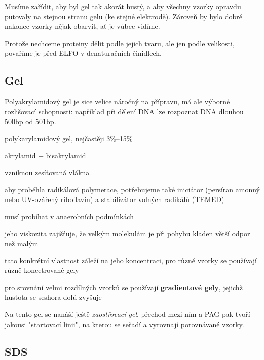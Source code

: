 \documentclass[DIV=8]{scrreprt}
\begin{document}
Musíme zařídit, aby byl gel tak akorát hustý, a aby všechny vzorky opravdu putovaly na stejnou stranu gelu (ke stejné elektrodě). Zároveň by bylo dobré nakonec vzorky nějak obarvit, ať je vůbec vidíme.

Protože nechceme proteiny dělit podle jejich tvaru, ale jen podle velikosti, povaříme je před ELFO v denaturačních činidlech.

\subsection{Gel} \label{Gel}


Polyakrylamidový gel je sice velice náročný na přípravu, má ale výborné rozlišovací schopnosti: například při dělení DNA lze rozpoznat DNA dlouhou 500bp od 501bp.

\begin{myItemize}[nosep]
    \item polykarylamidový gel, nejčastěji 3\%--15\%
    \item akrylamid \(+\) bisakrylamid
\begin{myItemize}[nosep]
    \item vzniknou zesíťovaná vlákna
    \item aby proběhla radikálová polymerace, potřebujeme také iniciátor (persíran amonný nebo UV-ozářený riboflavin) a stabilizátor volných radikálů (TEMED)
    \item musí probíhat v anaerobních podmínkách
\end{myItemize}

    \item jeho viskozita zajišťuje, že velkým molekulám je při pohybu kladen větší odpor než malým
\begin{myItemize}[nosep]
    \item tato konkrétní vlastnost záleží na jeho koncentraci, pro různé vzorky se používají různě koncetrované gely
    \item pro srovnání velmi rozdílných vzorků se používají \textbf{gradientové gely}, jejichž hustota se seshora dolů zvyšuje
\end{myItemize}

\end{myItemize}



Na tento gel se nanáší ještě \emph{zaostřovací gel}, přechod mezi ním a PAG pak tvoří jakousi "startovací linii", na kterou se seřadí a vyrovnají porovnávané vzorky.

\subsection{SDS} \label{SDS}
\end{document}
